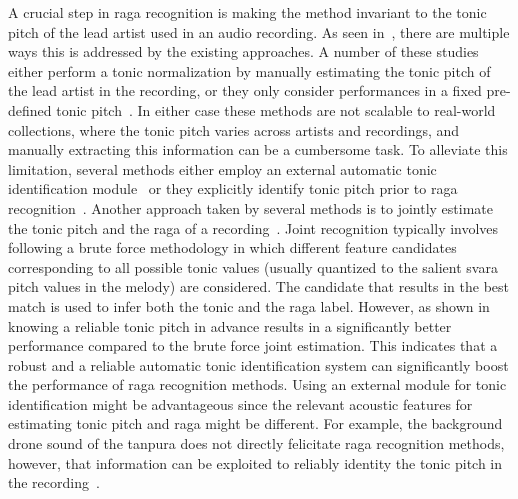 {A crucial step in \gls{raga} recognition is making the method invariant to the tonic pitch of the lead artist used in an audio recording. As seen in~, there are multiple ways this is addressed by the existing approaches. A number of these studies either perform a tonic normalization by manually estimating the tonic pitch of the lead artist in the recording, or they only consider performances in a fixed pre-defined tonic pitch~\citep{pandey2003tansen,chordia2007raag,belle2009raga,Shetty2009}. In either case these methods are not scalable to real-world collections, where the tonic pitch varies across artists and recordings, and manually extracting this information can be a cumbersome task. To alleviate this limitation, several methods either employ an external automatic tonic identification module~\citep{koduri2012raga,koduri2014intonation} or they explicitly identify tonic pitch prior to \gls{raga} recognition~\citep{ranjani2011carnatic,chakraborty2012object,shrey_ISMIR_2015}. Another approach taken by several methods is to jointly estimate the tonic pitch and the \gls{raga} of a recording~\cite{chordia2013joint,koduri2011survey,kumar2014identifying}. Joint recognition typically involves following a brute force methodology in which different feature candidates corresponding to all possible tonic values (usually quantized to the salient \gls{svara} pitch values in the melody) are considered. The candidate that results in the best match is used to infer both the tonic and the \gls{raga} label. However, as shown in~\cite{chordia2013joint} knowing a reliable tonic pitch in advance results in a significantly better performance compared to the brute force joint estimation. This indicates that a robust and a reliable automatic tonic identification system can significantly boost the performance of \gls{raga} recognition methods. Using an external module for tonic identification might be advantageous since the relevant acoustic features for estimating tonic pitch and \gls{raga} might be different. For example, the background drone sound of the \gls{tanpura} does not directly felicitate \gls{raga} recognition methods, however, that information can be exploited to reliably identity the tonic pitch in the recording~\citep{Gulati2014Tonic}.

}
